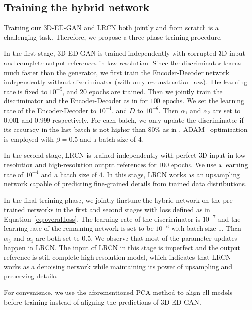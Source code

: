 \documentclass[10pt,twocolumn,letterpaper]{article}
\begin{document}
\subsection{Training the hybrid network}
\label{sec:training}


Training our 3D-ED-GAN and LRCN both jointly and from scratch is a challenging task. Therefore, we propose a three-phase training procedure. 

In the first stage, 3D-ED-GAN is trained independently with corrupted 3D input and complete output references in low resolution. Since the discriminator learns much faster than the generator, we first train the Encoder-Decoder network independently without discriminator (with only reconstruction loss).  The learning rate is fixed to $10^{-5}$, and $20$ epochs are trained. Then we jointly train the discriminator and the Encoder-Decoder as in \cite{dcgan} for $100$ epochs.  We set the learning rate of the Encoder-Decoder to $10^{-4}$, and $D$ to $10^{-6}$. Then $\alpha_1$ and $\alpha_2$ are set to 0.001 and 0.999 respectively. For each batch, we only update the discriminator if its accuracy in the last batch is not higher than 80\% as in \cite{3dgan}. ADAM~\cite{adam} optimization is employed with $\beta=0.5$ and a batch size of $4$.

In the second stage, LRCN is trained independently with perfect 3D input in low resolution and high-resolution output references for $100$ epochs. We use a learning rate of $10^{-4}$ and a batch size of $4$. In this stage, LRCN works as an upsampling network capable of predicting fine-grained details from trained data distributions.

In the final training phase, we jointly finetune the hybrid network on the pre-trained networks in the first and second stages with loss defined as in Equation~\ref{eq:overallloss}. The learning rate of the discriminator is $10^{-7}$ and the learning rate of the remaining network is set to be $10^{-6}$ with batch size $1$. Then $\alpha_3$ and $\alpha_4$ are both set to 0.5. We observe that most of the parameter updates happen in LRCN. The input of LRCN in this stage is imperfect and the output reference is still complete high-resolution model, which indicates that LRCN works as a denoising network while maintaining its power of upsampling and preserving details.

For convenience, we use the aforementioned PCA method to align all models before training instead of aligning the predictions of 3D-ED-GAN.
\end{document}
